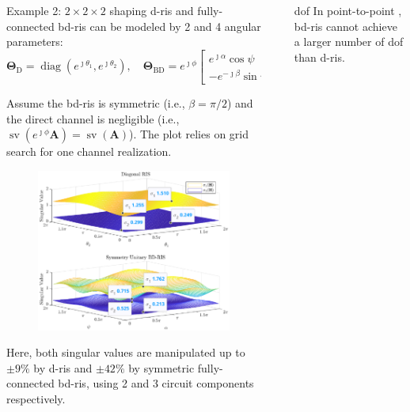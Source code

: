 \documentclass[final,xcolor={table}]{beamer}
\DeclareMathOperator{\diag}{diag}
\DeclareMathOperator{\sv}{sv}
\newlength{\sepwidth}
\newlength{\colwidth}
\newcommand{\separatorcolumn}{\begin{column}{\sepwidth}\end{column}}
\begin{document}
\begin{frame}[t]
\begin{columns}[t]
\begin{column}{\colwidth}
			\begin{exampleblock}{Example 2: $2 \times 2 \times 2$ shaping}
				\setlength{\leftskip}{\leftmargini}
				\setlength{\rightskip}{\leftmargini}
				\gls{d}-\gls{ris} and fully-connected \gls{bd}-\gls{ris} can be modeled by 2 and 4 angular parameters:
				\begin{equation*}
					\mathbf{\Theta}_\mathrm{D} = \diag(e^{\jmath \theta_1}, e^{\jmath \theta_2}), \quad
					\mathbf{\Theta}_\mathrm{BD} = e^{\jmath \phi} \begin{bmatrix}
						e^{\jmath \alpha} \cos \psi  & e^{\jmath \beta} \sin \psi   \\
						-e^{-\jmath \beta} \sin \psi & e^{-\jmath \alpha} \cos \psi
					\end{bmatrix}.
				\end{equation*}

				Assume the \gls{bd}-\gls{ris} is symmetric (i.e., $\beta = \pi / 2$) and the direct channel is negligible (i.e., $\sv(e^{\jmath \phi} \mathbf{A}) = \sv(\mathbf{A})$).
				The plot relies on grid search for one channel realization.
				\begin{figure}
					\centering
					\includegraphics[width=0.44\columnwidth]{../assets/simulation/singular_trend.eps}
				\end{figure}
				Here, both singular values are manipulated up to $\pm 9\%$ by \gls{d}-\gls{ris} and $\pm 42\%$ by symmetric fully-connected \gls{bd}-\gls{ris}, using 2 and 3 circuit components respectively.
			\end{exampleblock}
		\end{column}

		\separatorcolumn

		\begin{column}{\colwidth}
			\vspace{-0.5cm}
			\begin{prop}{\gls{dof}}{}
				\setlength{\leftskip}{\leftmargini}
				\setlength{\rightskip}{\leftmargini}
				In point-to-point , \gls{bd}-\gls{ris} cannot achieve a larger number of \gls{dof} than \gls{d}-\gls{ris}.
			\end{prop}


\end{column}
\end{columns}
\end{frame}
\end{document}
